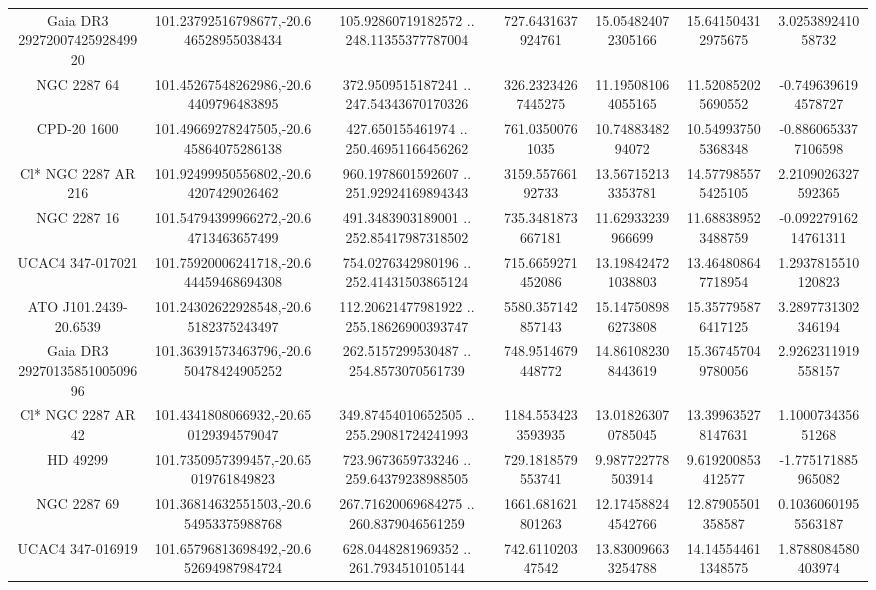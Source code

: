 \begin{table}
\begin{tabular}{ccccccc}
Gaia DR3 2927200742592849920 & 101.23792516798677,-20.646528955038434 & 105.92860719182572 .. 248.11355377787004 & 727.6431637924761 & 15.054824072305166 & 15.641504312975675 & 3.025389241058732 \\
NGC  2287    64 & 101.45267548262986,-20.64409796483895 & 372.9509515187241 .. 247.54343670170326 & 326.23234267445275 & 11.195081064055165 & 11.520852025690552 & -0.7496396194578727 \\
CPD-20  1600 & 101.49669278247505,-20.645864075286138 & 427.650155461974 .. 250.46951166456262 & 761.03500761035 & 10.7488348294072 & 10.549937505368348 & -0.8860653377106598 \\
Cl* NGC 2287     AR     216 & 101.92499950556802,-20.64207429026462 & 960.1978601592607 .. 251.92924169894343 & 3159.55766192733 & 13.567152133353781 & 14.577985575425105 & 2.2109026327592365 \\
NGC  2287    16 & 101.54794399966272,-20.64713463657499 & 491.3483903189001 .. 252.85417987318502 & 735.3481873667181 & 11.62933239966699 & 11.688389523488759 & -0.09227916214761311 \\
UCAC4 347-017021 & 101.75920006241718,-20.644459468694308 & 754.0276342980196 .. 252.41431503865124 & 715.6659271452086 & 13.198424721038803 & 13.464808647718954 & 1.2937815510120823 \\
ATO J101.2439-20.6539 & 101.24302622928548,-20.65182375243497 & 112.20621477981922 .. 255.18626900393747 & 5580.357142857143 & 15.147508986273808 & 15.357795876417125 & 3.2897731302346194 \\
Gaia DR3 2927013585100509696 & 101.36391573463796,-20.650478424905252 & 262.5157299530487 .. 254.8573070561739 & 748.9514679448772 & 14.861082308443619 & 15.367457049780056 & 2.9262311919558157 \\
Cl* NGC 2287     AR      42 & 101.4341808066932,-20.650129394579047 & 349.87454010652505 .. 255.29081724241993 & 1184.5534233593935 & 13.018263070785045 & 13.399635278147631 & 1.100073435651268 \\
HD  49299 & 101.7350957399457,-20.65019761849823 & 723.9673659733246 .. 259.64379238988505 & 729.1818579553741 & 9.987722778503914 & 9.619200853412577 & -1.775171885965082 \\
NGC  2287    69 & 101.36814632551503,-20.654953375988768 & 267.71620069684275 .. 260.8379046561259 & 1661.681621801263 & 12.174588244542766 & 12.87905501358587 & 0.10360601955563187 \\
UCAC4 347-016919 & 101.65796813698492,-20.652694987984724 & 628.0448281969352 .. 261.7934510105144 & 742.611020347542 & 13.830096633254788 & 14.145544611348575 & 1.8788084580403974 \\

\end{tabular}
\end{table}
